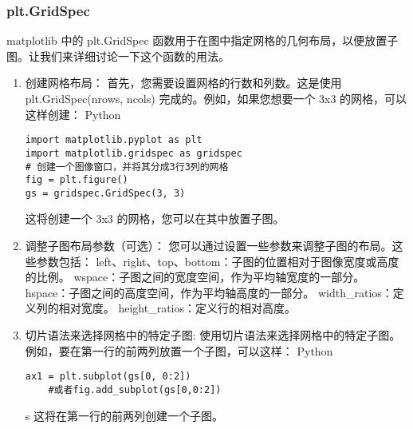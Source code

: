 \documentclass{article}
\begin{document}
\subsubsection{plt.GridSpec}
matplotlib 中的 plt.GridSpec 函数用于在图中指定网格的几何布局，以便放置子图。让我们来详细讨论一下这个函数的用法。
\begin{enumerate}
    \item  创建网格布局：
首先，您需要设置网格的行数和列数。这是使用 plt.GridSpec(nrows, ncols) 完成的。例如，如果您想要一个 3x3 的网格，可以这样创建：
Python
\begin{lstlisting}[caption={示例Python代码}]
import matplotlib.pyplot as plt
import matplotlib.gridspec as gridspec
# 创建一个图像窗口，并将其分成3行3列的网格
fig = plt.figure()
gs = gridspec.GridSpec(3, 3)
\end{lstlisting}
这将创建一个 3x3 的网格，您可以在其中放置子图。
    \item 调整子图布局参数（可选）：
您可以通过设置一些参数来调整子图的布局。这些参数包括：
left、right、top、bottom：子图的位置相对于图像宽度或高度的比例。
wspace：子图之间的宽度空间，作为平均轴宽度的一部分。
hspace：子图之间的高度空间，作为平均轴高度的一部分。
width\_ratios：定义列的相对宽度。
height\_ratios：定义行的相对高度。
    \item 切片语法来选择网格中的特定子图:
  使用切片语法来选择网格中的特定子图。例如，要在第一行的前两列放置一个子图，可以这样：
    Python
    \begin{lstlisting}[caption={示例Python代码}]
    ax1 = plt.subplot(gs[0, 0:2])
    #或者fig.add_subplot(gs[0,0:2])
    \end{lstlisting}s
    这将在第一行的前两列创建一个子图。
\end{enumerate}
\subsection{}
\end{document}
